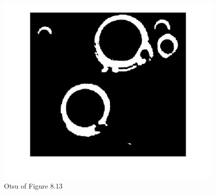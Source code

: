 \documentclass[11pt,oneside]{book}
\begin{document}
\begin{figure}[!htb]
   \centering  
   \includegraphics[width=1\textwidth]{images/9/otsu.jpg}
   \caption{Otsu of Figure 8.13}
\end{figure}
\end{document}
